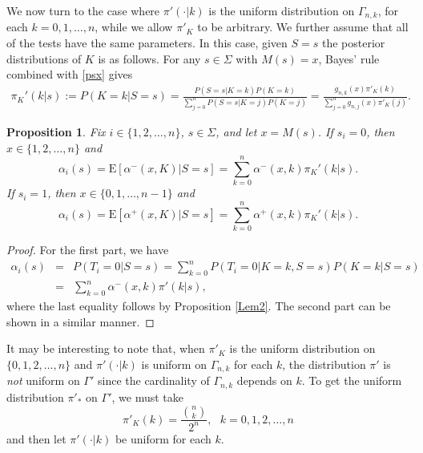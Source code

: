 \documentclass[a4paper,11pt]{article}
\newtheorem{prop}{Proposition}
\begin{document}
We now turn to the case where $\pi'(\cdot|k)$ is the uniform distribution on $\Gamma_{n,k}$, for each $k=0,1,\dots,n$, while we allow $\pi'_K$ to be arbitrary. We further assume that  all of the tests have the same parameters. In this case, given $S=s$ the posterior distributions of $K$ is as follows. For any $s\in \Sigma$ with $M(s)=x$, Bayes' rule combined with \eqref{psx} gives
\begin{eqnarray*}
\pi_K'(k|s) :=P(K=k|S=s) = \frac{P(S=s|K=k)P(K=k)}{\sum_{j=0}^n P(S=s|K=j)P(K=j)}= \frac{g_{n,k}(x)\pi'_K(k)}{\sum_{j=0}^n g_{n,j}(x)\pi'_K(j)}.
\end{eqnarray*}

\begin{prop}
Fix $i\in\{1,2,\dots,n\}$, $s\in \Sigma$, and let $x=M(s)$. If $s_i=0$, then $x\in\{1,2,\dots,n\}$ and
$$
\alpha_i(s) = \mathrm E[\alpha^-(x,K)|S=s] = \sum_{k=0}^n \alpha^-(x,k)\pi_K'(k|s).
$$
If $s_i=1$, then $x\in\{0,1,\dots,n-1\}$ and
$$
\alpha_i(s) = \mathrm E[\alpha^+(x,K)|S=s] = \sum_{k=0}^n \alpha^+(x,k)\pi_K'(k|s).
$$
\end{prop}

\begin{proof}
For the first part, we have
\begin{eqnarray*}
\alpha_i(s) &=& P(T_i=0|S=s) =\sum_{k=0}^n  P(T_i=0| K=k,S=s) P(K=k|S=s) \\
&=&  \sum_{k=0}^n \alpha^-(x,k)\pi'(k|s),
\end{eqnarray*}
where the last equality follows by Proposition \ref{Lem2}. The second part can be shown in a similar manner.
\end{proof}

It may be interesting to note that, when $\pi'_K$ is the uniform distribution on $\{0,1,2,\dots,n\}$ and $\pi'(\cdot|k)$ is uniform on $\Gamma_{n,k}$ for each $k$, the distribution $\pi'$ is {\em not} uniform on $\Gamma'$ since the cardinality of $\Gamma_{n,k}$ depends on $k$. To get the uniform distribution $\pi'_*$ on $\Gamma'$, we must take
$$
\pi'_K(k) = \frac{{n\choose k}}{2^n}, \ \ \ k=0,1,2,\dots,n
$$
and then let $\pi'(\cdot|k)$ be uniform for each $k$. 
\end{document}
